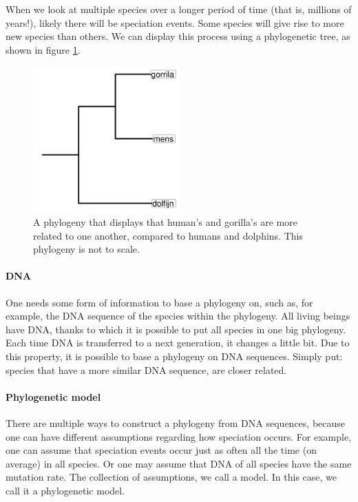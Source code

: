 When we look at multiple species over a longer period of 
time (that is, millions of years!), likely there will be speciation
events. Some species will give rise to more new species than others.
We can display this process using a phylogenetic tree, as shown
in figure \ref{fig:phylogeny}.

\begin{figure}
  \centering
  \includegraphics[width=0.5\textwidth]{phylogeny.png}
  \caption{
    A phylogeny that displays that human's and gorilla's
    are more related to one another, compared to
    humans and dolphins.
    This phylogeny is not to scale.
  }
  \label{fig:phylogeny}
\end{figure}

\paragraph{DNA}

One needs some form of information to base a phylogeny on,
such as, for example, the DNA sequence of the species
within the phylogeny.
All living beings have DNA, thanks to which it is possible 
to put all species in one big phylogeny.
Each time DNA is transferred to a next generation, it
changes a little bit.
Due to this property, it is possible to base a phylogeny
on DNA sequences.
Simply put: species that have a more similar DNA sequence, are
closer related.

\paragraph{Phylogenetic model}

There are multiple ways to construct a phylogeny
from DNA sequences, because one can have different 
assumptions regarding how speciation occurs.
For example, one can assume that speciation events
occur just as often all the time (on average) in all species.
Or one may assume that DNA of all species have the same mutation rate.
The collection of assumptions, we call a model. In this case,
we call it a phylogenetic model.


